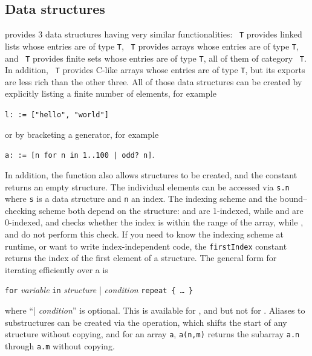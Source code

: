 \subsection{Data structures}
\salli provides 3 data structures having very similar functionalities:
~{\tt T} provides linked lists whose entries are of type {\tt T},
~{\tt T} provides arrays whose entries are of type {\tt T},
and ~{\tt T} provides finite sets whose entries are of type {\tt T},
all of them of category ~{\tt T}.
In addition, ~{\tt T} provides
C-like arrays whose entries
are of type {\tt T}, but its exports are less rich than the other three.
All of those data structures can be created by explicitly listing a
finite number of elements, for example\\
\centerline{{\tt l:  := ["hello", "world"] }}
or by bracketing a generator, for example\\
\centerline{ {\tt a:  :=
[n for n in 1..100 | odd?~n]}.}
In addition, the function 
also allows structures to be created, and the constant
returns an empty structure. The individual elements can
be accessed via {\tt s.n} where {\tt s} is a data structure and
{\tt n} an index. The indexing scheme and the bound--checking scheme
both depend on the structure:
 and  are 1-indexed, while
 and  are 0-indexed, and
 checks whether the index is within the range
of the array, while ,  and  do
not perform this check. If you need to know the indexing scheme at runtime,
or want to write index-independent code, the {\tt firstIndex} constant
returns the index of the first element of a structure.
The general form for iterating efficiently over a
 is\\
\centerline{ {\tt for} {\em variable} {\tt in} {\em structure}
| {\em condition} {\tt repeat \{ \dots~\}} }
where ``| {\em condition}'' is optional. This is available
for ,  and 
but not for .
Aliases to substructures can be created via the
 operation,
which shifts the start of any structure without copying, and for
an array {\tt a}, {\tt a(n,m)} returns the subarray {\tt a.n}
through {\tt a.m} without copying.

